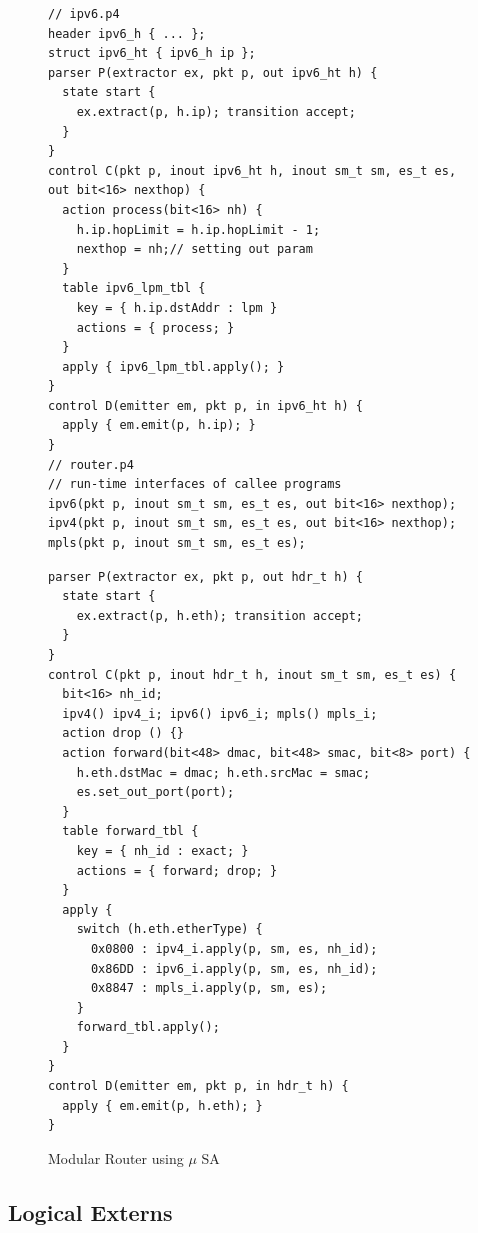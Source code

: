 \begin{figure}[ht]
\noindent \begin{minipage}[t]{.50\textwidth}
\begin{lstlisting}[frame=none]
// ipv6.p4
header ipv6_h { ... }; 
struct ipv6_ht { ipv6_h ip };
parser P(extractor ex, pkt p, out ipv6_ht h) {
  state start {
    ex.extract(p, h.ip); transition accept;
  }
}
control C(pkt p, inout ipv6_ht h, inout sm_t sm, es_t es, out bit<16> nexthop) {
  action process(bit<16> nh) {
    h.ip.hopLimit = h.ip.hopLimit - 1;
    nexthop = nh;// setting out param
  }
  table ipv6_lpm_tbl {
    key = { h.ip.dstAddr : lpm } 
    actions = { process; }
  }
  apply { ipv6_lpm_tbl.apply(); }
}
control D(emitter em, pkt p, in ipv6_ht h) {
  apply { em.emit(p, h.ip); }
}
// router.p4
// run-time interfaces of callee programs
ipv6(pkt p, inout sm_t sm, es_t es, out bit<16> nexthop);
ipv4(pkt p, inout sm_t sm, es_t es, out bit<16> nexthop);
mpls(pkt p, inout sm_t sm, es_t es);
\end{lstlisting}
\end{minipage}\hspace{-4pt}\vline
\hfill\begin{minipage}[t]{.50\textwidth}
\begin{lstlisting}[frame=none]
parser P(extractor ex, pkt p, out hdr_t h) {
  state start {
    ex.extract(p, h.eth); transition accept;
  }
}
control C(pkt p, inout hdr_t h, inout sm_t sm, es_t es) {
  bit<16> nh_id;
  ipv4() ipv4_i; ipv6() ipv6_i; mpls() mpls_i;
  action drop () {}           
  action forward(bit<48> dmac, bit<48> smac, bit<8> port) {
    h.eth.dstMac = dmac; h.eth.srcMac = smac;
    es.set_out_port(port);
  }
  table forward_tbl {
    key = { nh_id : exact; } 
    actions = { forward; drop; }
  }
  apply {
    switch (h.eth.etherType) {
      0x0800 : ipv4_i.apply(p, sm, es, nh_id);
      0x86DD : ipv6_i.apply(p, sm, es, nh_id);
      0x8847 : mpls_i.apply(p, sm, es);
    }
    forward_tbl.apply(); 
  }
}
control D(emitter em, pkt p, in hdr_t h) {
  apply { em.emit(p, h.eth); }
}
\end{lstlisting}
\end{minipage}
\caption{Modular Router using $\mu$ SA}
\label{fig:modular-router}
\end{figure}

\subsection{Logical Externs}
\label{subsection:logical-externs}
